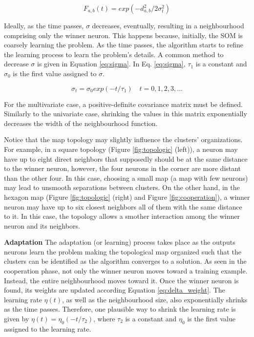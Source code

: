 \begin{equation}
    F_{a,b}(t) = exp(-d_{a,b}^2/2\sigma_{t}^2)
    \label{eq:factor_update}
\end{equation}

Ideally, as the time passes, $\sigma$ decreases, eventually, resulting in a neighbourhood comprising only the winner neuron. This happens because, initially, the SOM is coarsely learning the problem. As the time passes, the algorithm starts to refine the learning process to learn the problem's details. A common method to decrease $\sigma$ is given in Equation \ref{eq:sigma}. In Eq. \ref{eq:sigma}, $\tau_{1}$ is a constant and $\sigma_{0}$ is the first value assigned to $\sigma$.

\begin{equation}
    \sigma_{t} = \sigma_{0} exp(-t/\tau_{1}) \quad t = 0, 1, 2, 3,...
    \label{eq:sigma}
\end{equation}

For the multivariate case, a positive-definite covariance matrix must be defined. Similarly to the univariate case, shrinking the values in this matrix exponentially decreases the width of the neighbourhood function.  

Notice that the map topology may slightly influence the clusters' organizations. For example, in a square topology (Figure \ref{fig:topologic} (left)), a neuron may have up to eight direct neighbors that supposedly should be at the same distance to the winner neuron, however, the four neurons in the corner are more distant than the other four. In this case, choosing a small map (a map with few neurons) may lead to unsmooth separations between clusters. On the other hand, in the hexagon map (Figure \ref{fig:topologic} (right) and Figure \ref{fig:cooperation}), a winner neuron may have up to six closest neighbors all of them with the same distance to it. In this case, the topology allows a smother interaction among the winner neuron and its neighbors. 


\vspace{0.2cm}

\noindent\textbf{Adaptation} The adaptation (or learning) process takes place as the outputs neurons learn the problem making the topological map organized such that the clusters can be identified as the algorithm converges to a solution. As seen in the cooperation phase, not only the winner neuron moves toward a training example. Instead, the entire neighbourhood moves toward it. Once the winner neuron is found, its weights are updated according Equation \ref{eq:delta_weight}. The learning rate $\eta(t)$, as well as the neighbourhood size, also exponentially shrinks as the time passes. Therefore, one plausible way to shrink the learning rate is given by $\eta (t) = \eta_{0} (-t/\tau_{2})$, where $\tau_{2}$ is a constant and $\eta_{0}$ is the first value assigned to the learning rate.

